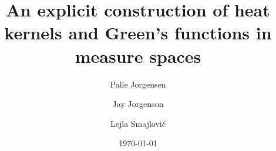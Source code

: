 \documentclass[11pt,reqno]{amsart}
\theoremstyle{remark}
\theoremstyle{definition}
\numberwithin{theorem}{section} \numberwithin{equation}{section}
\newcommand{\X}{\mathfrak{X}}
\newcommand\blfootnote[1]{%
  \begingroup
  \renewcommand\thefootnote{}\footnote{#1}%
  \addtocounter{footnote}{-1}%
  \endgroup
}
\newenvironment{dedication}
  {%
   \itshape             %
   \raggedleft          %
  }
\begin{document}
\title{An explicit construction of heat kernels and Green's functions in measure spaces}
\author{Palle Jorgensen \and Jay Jorgenson
\and Lejla Smajlovi\'{c}}

\date{\today}
\begin{abstract}
We explicitly construct a heat kernel as a Neumann series for certain function spaces, such as $L^{1}$, $L^{2}$, and Hilbert spaces,
associated to a locally compact Hausdorff space $\X$ with Borel $\sigma$-algebra $$, and
endowed with additional measure-theoretic data.
Our approach is an adaptation of classical work due to
Minakshishundaram and Pleijel, and it requires as input a parametrix or small time approximation to the heat kernel.
The methodology developed in this article applies to yield new instances of heat
kernel constructions, including normalized Laplacians on finite and infinite graphs as well as Hilbert spaces with reproducing
kernels.
\end{abstract}

\blfootnote{Keywords: heat kernels, Neumann series, generalized time convolution, parametrix}
\blfootnote{AMS Classification numbers.  35K08,  58J35, 44A35, 31C20, 46E30, 46E22, 47A10}
\maketitle

\begin{dedication}
\hspace{4cm}
{Dedicated to the memory of Professor Robert Strichartz.}
\end{dedication}

\section{Introduction}

\subsection{Imagining the heat kernel in the physical world}
From its inception, a certain class of heat kernels $K(x,y;t)$ consists of mathematical objects which are rooted in the physical world.   For example,
one can imagine introducing a unit burst of heat at a point $x$ in a domain $M$ at time zero, after which one then can measure
the proportion of heat which has diffused to the point $y$ after time $t$.  This amount of heat is denoted by $K(x,y;t)$.
Equivalently, one can envision a particle which undertakes a random walk on $M$ beginning at $x$ at time zero, so then
$K(x,y;t)$ is interpreted as the probability that the particle is at the point $y$ at time $t$.
\end{document}
